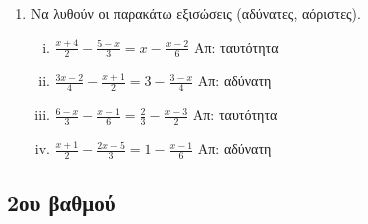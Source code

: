 \begin{enumerate}
  \item  Να λυθούν οι παρακάτω εξισώσεις (αδύνατες, αόριστες).
    \begin{enumerate}[i)]
      \item $ \frac{x+4}{2} - \frac{5-x}{3} = x - \frac{x-2}{6} $ \hfill Απ: ταυτότητα
      \item $ \frac{3x-2}{4} - \frac{x+1}{2} = 3 - \frac{3-x}{4} $ \hfill Απ: αδύνατη 
      \item $ \frac{6-x}{3} - \frac{x-1}{6} = \frac{2}{3} - \frac{x-3}{2} $ 
        \hfill Απ: ταυτότητα
      \item $ \frac{x+1}{2} - \frac{2x-5}{3} = 1 - \frac{x-1}{6} $ \hfill Απ: αδύνατη 
    \end{enumerate}
\end{enumerate}

\subsection*{2ου βαθμού}

